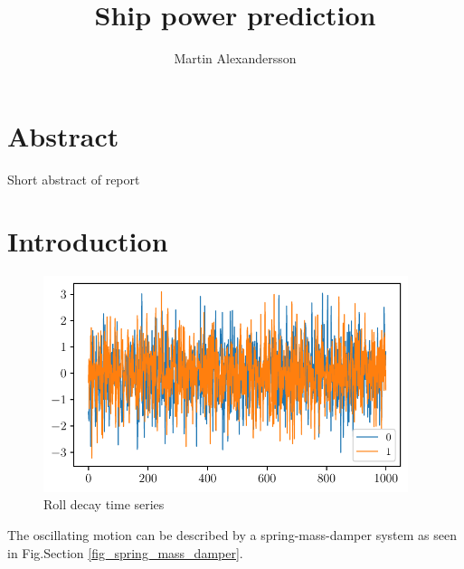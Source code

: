 \documentclass[11pt]{article}
\title{Ship power prediction}
\author{Martin Alexandersson}
\begin{document}
    
    \maketitle
    
    

    
    \hypertarget{abstract}{%
\section{Abstract}\label{abstract}}

Short abstract of report

    \hypertarget{introduction}{%
\section{Introduction}\label{introduction}}

    

    \begin{figure}[H]
        \begin{center}\includegraphics[width = 0.95\textwidth]{rolldecay_example.pdf}\end{center}
        \vspace{-0.7cm}
        \caption{Roll decay time series}
        \label{fig:rolldecay_example}
    \end{figure}
    
    The oscillating motion can be described by a spring-mass-damper system
as seen in Fig.Section \ref{fig_spring_mass_damper}.

    
\end{document}
